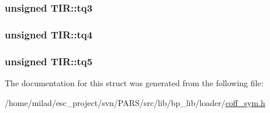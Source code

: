 \label{structTIR_a4ffe0f8d8f19acd1643350c2a7e21e95}
\hypertarget{structTIR_a4dd400d0019e055a1da486ee4aa72200}{
\subsubsection[{tq3}]{\setlength{\rightskip}{0pt plus 5cm}unsigned {\bf TIR::tq3}}}
\label{structTIR_a4dd400d0019e055a1da486ee4aa72200}
\hypertarget{structTIR_a7d0bbdc22424c97b19a7b31bd032df33}{
\subsubsection[{tq4}]{\setlength{\rightskip}{0pt plus 5cm}unsigned {\bf TIR::tq4}}}
\label{structTIR_a7d0bbdc22424c97b19a7b31bd032df33}
\hypertarget{structTIR_a339261bf84849dee1a8e64b31c6e6991}{
\subsubsection[{tq5}]{\setlength{\rightskip}{0pt plus 5cm}unsigned {\bf TIR::tq5}}}
\label{structTIR_a339261bf84849dee1a8e64b31c6e6991}


The documentation for this struct was generated from the following file:\begin{DoxyCompactItemize}
\item 
/home/milad/esc\_\-project/svn/PARS/src/lib/bp\_\-lib/loader/\hyperlink{coff__sym_8h}{coff\_\-sym.h}\end{DoxyCompactItemize}
